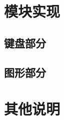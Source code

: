 \documentclass[fontset=adobe]{ctexart}
\begin{document}
\section{模块实现}

\subsection{键盘部分}

\subsection{图形部分}

\section{其他说明}
\end{document}
